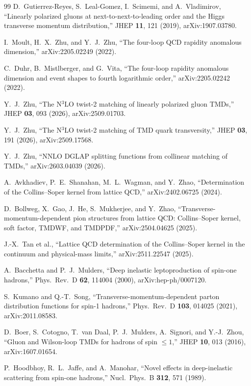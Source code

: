 \documentclass[11pt]{article}
\begin{document}
\begin{thebibliography}{99}
D.~Gutierrez-Reyes, S.~Leal-Gomez, I.~Scimemi, and A.~Vladimirov,
``Linearly polarized gluons at next-to-next-to-leading order and the Higgs transverse momentum distribution,''
JHEP \textbf{11}, 121 (2019), arXiv:1907.03780.

I.~Moult, H.~X.~Zhu, and Y.~J.~Zhu,
``The four-loop QCD rapidity anomalous dimension,''
arXiv:2205.02249 (2022).

C.~Duhr, B.~Mistlberger, and G.~Vita,
``The four-loop rapidity anomalous dimension and event shapes to fourth logarithmic order,''
arXiv:2205.02242 (2022).

Y.~J.~Zhu,
``The N\(^{3}\)LO twist-2 matching of linearly polarized gluon TMDs,''
JHEP \textbf{03}, 093 (2026), arXiv:2509.01703.

Y.~J.~Zhu,
``The N\(^{3}\)LO twist-2 matching of TMD quark transversity,''
JHEP \textbf{03}, 191 (2026), arXiv:2509.17568.

Y.~J.~Zhu,
``NNLO DGLAP splitting functions from collinear matching of TMDs,''
arXiv:2603.04039 (2026).

A.~Avkhadiev, P.~E.~Shanahan, M.~L.~Wagman, and Y.~Zhao,
``Determination of the Collins--Soper kernel from lattice QCD,''
arXiv:2402.06725 (2024).

D.~Bollweg, X.~Gao, J.~He, S.~Mukherjee, and Y.~Zhao,
``Transverse-momentum-dependent pion structures from lattice QCD: Collins--Soper kernel, soft factor, TMDWF, and TMDPDF,''
arXiv:2504.04625 (2025).

J.-X.~Tan et al.,
``Lattice QCD determination of the Collins--Soper kernel in the continuum and physical-mass limits,''
arXiv:2511.22547 (2025).

A.~Bacchetta and P.~J.~Mulders,
``Deep inelastic leptoproduction of spin-one hadrons,''
Phys.\ Rev.\ D \textbf{62}, 114004 (2000), arXiv:hep-ph/0007120.

S.~Kumano and Q.-T.~Song,
``Transverse-momentum-dependent parton distribution functions for spin-1 hadrons,''
Phys.\ Rev.\ D \textbf{103}, 014025 (2021), arXiv:2011.08583.

D.~Boer, S.~Cotogno, T.~van Daal, P.~J.~Mulders, A.~Signori, and Y.-J.~Zhou,
``Gluon and Wilson-loop TMDs for hadrons of spin \(\leq1\),''
JHEP \textbf{10}, 013 (2016), arXiv:1607.01654.

P.~Hoodbhoy, R.~L.~Jaffe, and A.~Manohar,
``Novel effects in deep-inelastic scattering from spin-one hadrons,''
Nucl.\ Phys.\ B \textbf{312}, 571 (1989).

\end{thebibliography}
\end{document}
